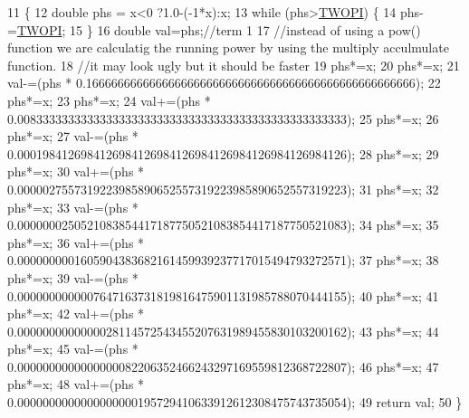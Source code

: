 \begin{DoxyCode}
11                                             \{
12     \textcolor{keywordtype}{double} phs = x<0 ?1.0-(-1*x):x;
13     \textcolor{keywordflow}{while} (phs>\hyperlink{PI_8h_a4912c64aec0c943b7985db6cb61ff83a}{TWOPI}) \{
14         phs-=\hyperlink{PI_8h_a4912c64aec0c943b7985db6cb61ff83a}{TWOPI};
15     \}
16     \textcolor{keywordtype}{double} val=phs;\textcolor{comment}{//term 1}
17     \textcolor{comment}{//instead of using a pow() function we are calculatig the running power by using the multiply
       acculmulate function.}
18     \textcolor{comment}{//it may look ugly but it should be faster}
19     phs*=x;
20     phs*=x;
21     val-=(phs * 0.1666666666666666666666666666666666666666666666666666);
22     phs*=x;
23     phs*=x;
24     val+=(phs * 0.0083333333333333333333333333333333333333333333333333);
25     phs*=x;
26     phs*=x;
27     val-=(phs * 0.0001984126984126984126984126984126984126984126984126);
28     phs*=x;
29     phs*=x;
30     val+=(phs * 0.0000027557319223985890652557319223985890652557319223);
31     phs*=x;
32     phs*=x;
33     val-=(phs * 0.0000000250521083854417187750521083854417187750521083);
34     phs*=x;
35     phs*=x;
36     val+=(phs * 0.0000000001605904383682161459939237717015494793272571);
37     phs*=x;
38     phs*=x;
39     val-=(phs * 0.0000000000007647163731819816475901131985788070444155);
40     phs*=x;
41     phs*=x;
42     val+=(phs * 0.0000000000000028114572543455207631989455830103200162);
43     phs*=x;
44     phs*=x;
45     val-=(phs * 0.0000000000000000082206352466243297169559812368722807);
46     phs*=x;
47     phs*=x;
48     val+=(phs * 0.0000000000000000000195729410633912612308475743735054);
49     \textcolor{keywordflow}{return} val;
50 \}\end{DoxyCode}
